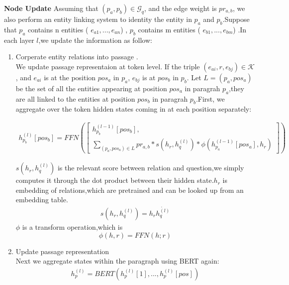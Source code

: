 \documentclass[sigconf]{acmart}
\begin{document}
	\textbf{Node Update}		
	 Assuming that $(p_a,p_b) \in \mathcal{G}_q$, and the edge weight is $pr_{a,b}$, we also perform an entity linking system\cite{ferragina2011fast} to identity the  entity in $p_a$ and $p_b$.Suppose that		
		$p_a$ contains n entities ( $e_{a1},...,e_{an}$) ,		
		$p_b$ contains m entities ( $e_{b1},...,e_{bm}$) .In each layer $l$,we update the information as follow:
		\begin{enumerate}[(1)]
		\item Corperate entity relations into passage .\\	
			We update passage representaion at token level.	
			If the triple $(e_{ai},r,e_{bj}) \in \mathcal{K}$, and $e_{ai}$ is at the position $pos_a$ in $p_a$, $e_{bj}$ is at  $pos_b$  in $p_b$.		
			Let $L=(p_a,pos_a)$ be the set of all the entities appearing at position $pos_a$ in paragrah $p_a$,they are all linked to the entities at position $pos_b$ in paragrah $p_b$.First, we aggregate over the token hidden states coming in at
			each position separately: 
			
			\begin{displaymath}
				\begin{aligned}
					h^{(l)}_{p_b}[pos_b] = FFN
					\left(					 
						\begin{bmatrix}  
							h^{(l-1)}_{p_b}[pos_b],\\ 		
							\sum\limits_{(p_a,pos_a) \in L}
							pr_{a,b}*
							s(h_r,h_q^{(l)})*
							\phi(h^{(l-1)}_{p_a}[pos_a],h_r)
						\end{bmatrix} 
					\right)								
				\end{aligned}
			\end{displaymath}
		
		$s(h_r,h_q^{(l)})$ is the relevant score between relation and question,we simply computes it through the dot product between their hidden state.$h_r$ is embedding of  relations,which are pretrained and can be looked up from an embedding table.
		 \begin{displaymath}
		 	\begin{aligned}
		 		s(h_r,h_q^{(l)}) = h_r\dot{h_q^{(l)}}
	 		\end{aligned}
 		\end{displaymath}
 		$\phi$ is a transform operation,which is 
 		 \begin{displaymath}
 		 	\phi(h,r) = FFN(h;r)
 		 \end{displaymath}
		
		\item Update passage representation\\
		Next we aggregate states within the paragraph using BERT again:
		\begin{displaymath}
			\begin{aligned}
				h_{p}^{(l)} = BERT(h_p^{(l)}[1],...,h_p^{(l)}[pos])
			\end{aligned}
		\end{displaymath}
	

\end{enumerate}
\end{document}
